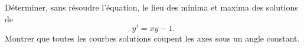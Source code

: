 \begin{exercice}\label{exoEquaDiff0005}

Déterminer, sans résoudre l'équation,  le lieu des minima et maxima des solutions de
\begin{equation}
	y'=xy-1.
\end{equation}
Montrer que toutes les courbes solutions coupent les axes sous un angle constant.

\end{exercice}
